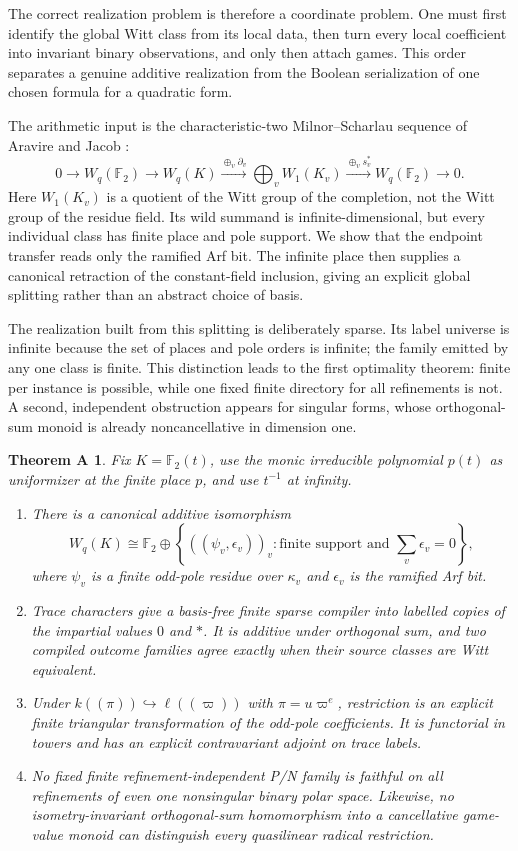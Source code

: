 \documentclass[11pt]{article}
\newtheorem*{thmA}{Theorem A}
\theoremstyle{definition}
\theoremstyle{remark}
\newcommand{\F}{\mathbb{F}}
\begin{document}
The correct realization problem is therefore a coordinate problem.  One must
first identify the global Witt class from its local data, then turn every
local coefficient into invariant binary observations, and only then attach
games.  This order separates a genuine additive realization from the Boolean
serialization of one chosen formula for a quadratic form.

The arithmetic input is the characteristic-two Milnor--Scharlau sequence of
Aravire and Jacob \cite[Theorem~6.2]{aravirejacob2006}:
\[
0\longrightarrow W_q(\F_2)\longrightarrow W_q(K)
 \xrightarrow{\oplus_v\partial_v}
 \bigoplus_v W_1(K_v)
 \xrightarrow{\oplus_v s_v^*}W_q(\F_2)\longrightarrow0.
\]
Here $W_1(K_v)$ is a quotient of the Witt group of the completion, not the
Witt group of the residue field.  Its wild summand is infinite-dimensional,
but every individual class has finite place and pole support.  We show that
the endpoint transfer reads only the ramified Arf bit.  The infinite place
then supplies a canonical retraction of the constant-field inclusion, giving
an explicit global splitting rather than an abstract choice of basis.

The realization built from this splitting is deliberately sparse.  Its label
universe is infinite because the set of places and pole orders is infinite;
the family emitted by any one class is finite.  This distinction leads to the
first optimality theorem: finite per instance is possible, while one fixed
finite directory for all refinements is not.  A second, independent
obstruction appears for singular forms, whose orthogonal-sum monoid is already
noncancellative in dimension one.

\begin{thmA}
Fix $K=\F_2(t)$, use the monic irreducible polynomial $p(t)$ as uniformizer at
the finite place $p$, and use $t^{-1}$ at infinity.
\begin{enumerate}
\item There is a canonical additive isomorphism
\[
W_q(K)\cong
\F_2\oplus
\left\{((\psi_v,\epsilon_v))_v:
  \text{finite support and }\sum_v\epsilon_v=0\right\},
\]
where $\psi_v$ is a finite odd-pole residue over $\kappa_v$ and
$\epsilon_v$ is the ramified Arf bit.
\item Trace characters give a basis-free finite sparse compiler into labelled
copies of the impartial values $0$ and $*$.  It is additive under orthogonal
sum, and two compiled outcome families agree exactly when their source classes
are Witt equivalent.
\item Under $k((\pi))\hookrightarrow\ell((\varpi))$ with
$\pi=u\varpi^e$, restriction is an explicit finite triangular transformation
of the odd-pole coefficients.  It is functorial in towers and has an explicit
contravariant adjoint on trace labels.
\item No fixed finite refinement-independent P/N family is faithful on all
refinements of even one nonsingular binary polar space.  Likewise, no
isometry-invariant orthogonal-sum homomorphism into a cancellative game-value
monoid can distinguish every quasilinear radical restriction.
\end{enumerate}
\end{thmA}
\end{document}
